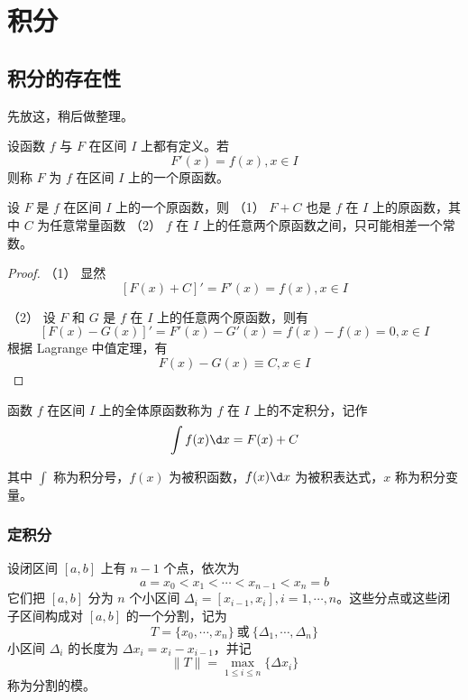 
\chapter{积分}

\section{积分的存在性}

先放这，稍后做整理。

\begin{definition}
    设函数 $f$ 与 $F$ 在区间 $I$ 上都有定义。若
    $$F'(x) = f(x), x\in I$$
    则称 $F$ 为 $f$ 在区间 $I$ 上的一个原函数。
\end{definition}

\begin{theorem}
    设 $F$ 是 $f$ 在区间 $I$ 上的一个原函数，则
    （1） $F+C$ 也是 $f$ 在 $I$ 上的原函数，其中 $C$ 为任意常量函数
    （2） $f$ 在 $I$ 上的任意两个原函数之间，只可能相差一个常数。
\end{theorem}
\begin{proof}
    （1） 显然
    $$\left[ F(x)+C \right]' = F'(x) = f(x), x\in I$$
    
    （2） 设 $F$ 和 $G$ 是 $f$ 在 $I$ 上的任意两个原函数，则有
    $$\left[ F(x)-G(x) \right]' = F'(x) - G'(x) = f(x) - f(x) = 0, x\in I$$
    根据 Lagrange 中值定理，有
    $$F(x) - G(x) \equiv C, x\in I$$
\end{proof}

\begin{definition}
    函数 $f$ 在区间 $I$ 上的全体原函数称为 $f$ 在 $I$ 上的不定积分，记作
    $$\int f(x) \d x = F(x) + C$$
\end{definition}

其中 $\displaystyle\int$ 称为积分号，$f(x)$ 为被积函数，$f(x)\d x$ 为被积表达式，$x$ 称为积分变量。

\subsection{定积分}

设闭区间 $[a,b]$ 上有 $n-1$ 个点，依次为
$$a = x_0 < x_1 < \cdots < x_{n-1} < x_n = b$$
它们把 $[a,b]$ 分为 $n$ 个小区间 $\Delta_i = [x_{i-1},x_i], i=1,\cdots,n$。这些分点或这些闭子区间构成对 $[a,b]$ 的一个分割，记为
$$T=\{x_0,\cdots,x_n\}\ \text{或}\ \{\Delta_1,\cdots,\Delta_n\}$$
小区间 $\Delta_i$ 的长度为 $\Delta x_i = x_i-x_{i-1}$，并记 
$$\| T \| = \max_{1 \leqslant i \leqslant n}\{\Delta x_i\}$$
称为分割的模。

